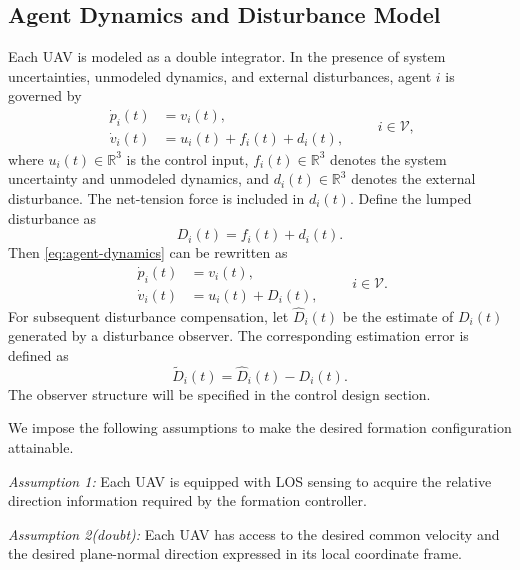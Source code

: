 \documentclass[lettersize,journal]{IEEEtran}
\begin{document}
\subsection{Agent Dynamics and Disturbance Model}

Each UAV is modeled as a double integrator. In the presence of system uncertainties, unmodeled dynamics, and external disturbances, agent \(i\) is governed by
\begin{equation}
\label{eq:agent-dynamics}
\begin{aligned}
\dot p_i(t)&=v_i(t),\\
\dot v_i(t)&=u_i(t)+f_i(t)+d_i(t),
\end{aligned}
\qquad i\in\mathcal V,
\end{equation}
where \(u_i(t)\in\mathbb R^3\) is the control input, \(f_i(t)\in\mathbb R^3\) denotes the system uncertainty and unmodeled dynamics, and \(d_i(t)\in\mathbb R^3\) denotes the external disturbance. The net-tension force is included in \(d_i(t)\). Define the lumped disturbance as
\begin{equation}
\label{eq:lumped-disturbance}
D_i(t)=f_i(t)+d_i(t).
\end{equation}
Then \eqref{eq:agent-dynamics} can be rewritten as
\begin{equation}
\label{eq:compact-dynamics}
\begin{aligned}
\dot p_i(t)&=v_i(t),\\
\dot v_i(t)&=u_i(t)+D_i(t),
\end{aligned}
\qquad i\in\mathcal V.
\end{equation}
For subsequent disturbance compensation, let \(\hat D_i(t)\) be the estimate of \(D_i(t)\) generated by a disturbance observer. The corresponding estimation error is defined as
\begin{equation}
\label{eq:disturbance-error}
\tilde D_i(t)=\hat D_i(t)-D_i(t).
\end{equation}
The observer structure will be specified in the control design section.

We impose the following assumptions to make the desired formation configuration attainable.

\emph{Assumption 1:} Each UAV is equipped with LOS sensing to acquire the relative direction information required by the formation controller.

\emph{Assumption 2(doubt):} Each UAV has access to the desired common velocity and the desired plane-normal direction expressed in its local coordinate frame.
\end{document}
